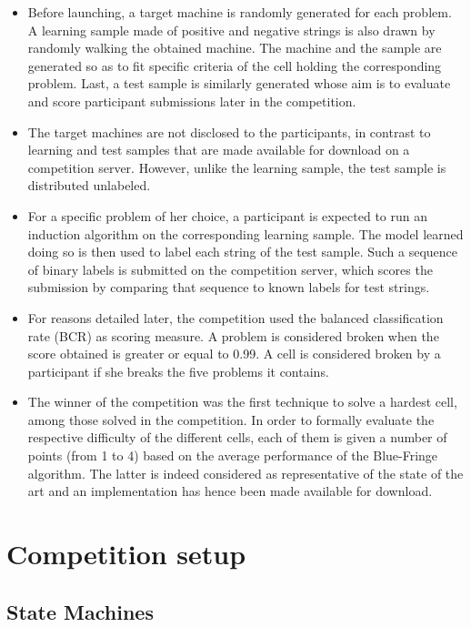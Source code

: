 \begin{itemize}
\item Before launching, a target machine is randomly generated for each problem. A learning sample made of positive and negative strings is also drawn by randomly walking the obtained machine. The machine and the sample are generated so as to fit specific criteria of the cell holding the corresponding problem. Last, a test sample is similarly generated whose aim is to evaluate and score participant submissions later in the competition.
\item The target machines are not disclosed to the participants, in contrast to learning and test samples that are made available for download on a competition server. However, unlike the learning sample, the test sample is distributed unlabeled. 
\item For a specific problem of her choice, a participant is expected to run an induction algorithm on the corresponding learning sample. The model learned doing so is then used to label each string of the test sample. Such a sequence of binary labels is submitted on the competition server, which scores the submission by comparing that sequence to known labels for test strings. 
\item For reasons detailed later, the competition used the balanced classification rate (BCR) as scoring measure. A problem is considered broken when the score obtained is greater or equal to 0.99. A cell is considered broken by a participant if she breaks the five problems it contains. 
\item The winner of the competition was the first technique to solve a hardest cell, among those solved in the competition. In order to formally evaluate the respective difficulty of the different cells, each of them is given a number of points (from 1 to 4) based on the average performance of the Blue-Fringe algorithm. The latter is indeed considered as representative of the state of the art and an implementation has hence been made available for download. 
\end{itemize}

\section{Competition setup\label{subsection_stamina_setup}}

\subsection{State Machines}

